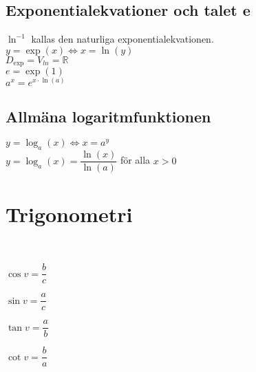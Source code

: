\documentclass{article}
\begin{document}
\subsection{Exponentialekvationer och talet e}
\begin{doublespace}
$\ln^{-1}$ kallas den naturliga exponentialekvationen.\\
$y = \exp(x) \Leftrightarrow x = \ln(y)$\\
$D_{\exp} = V_{ln} = \mathbb{R}$ \\
$e = \exp(1)$\\
$a^x = e^{x\cdot \ln(a)}$
\subsection{Allmäna logaritmfunktionen}
$y = \log_a(x) \Leftrightarrow x = a^y$\\
$y = \log_a(x) = \dfrac{\ln(x)}{\ln(a)}$ för alla $x > 0$\\
\end{doublespace}
\section{Trigonometri}
\\
\begin{doublespace}
\begin{minipage}[t]{0.25\textwidth}
$\cos v = \dfrac{b}{c}$\\
\end{minipage}
\begin{minipage}[t]{0.25\textwidth}
$\sin v = \dfrac{a}{c}$\\
\end{minipage}
\begin{minipage}[t]{0.25\textwidth}
$\tan v = \dfrac{a}{b}$\\
\end{minipage}
\begin{minipage}[t]{0.25\textwidth}
$\cot v = \dfrac{b}{a}$\\
\end{minipage}
\end{doublespace}
\end{document}
